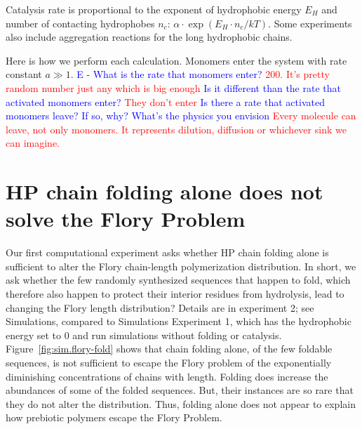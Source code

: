 \documentclass[journal=jacsat,manuscript=article,layout=twocolumn]{achemso}
\newcommand*{\ga}{\alpha}
\newcommand*{\red}[1]{\textcolor{red}{#1}}
\newcommand*{\blue}[1]{\textcolor{blue}{#1}}
\begin{document}
Catalysis rate is proportional to the exponent of hydrophobic energy $E_H$ and number of 
contacting hydrophobes $n_c$: $\ga\cdot\exp(E_{H}\cdot n_{c}/kT)$. Some experiments also include 
aggregation reactions for the long hydrophobic chains.

Here is how we perform each calculation.  Monomers enter the system with rate constant $a\gg1$.  
\blue{E - What is the rate that monomers enter? }\red{200. It's pretty random number just 
any which is big enough} \blue{Is it different than the rate that activated monomers enter?} 
\red{They don't enter}  \blue{Is there a rate that activated monomers leave?  If so, why? What's the 
physics you envision } \red{Every molecule can leave, not only monomers. It represents dilution, 
diffusion or whichever sink we can imagine.}
 



\section{HP chain folding alone does not solve the Flory Problem}
Our first computational experiment asks whether HP chain folding alone is sufficient to 
alter the Flory chain-length polymerization distribution.  In short, we ask whether the few randomly 
synthesized sequences that happen to fold, which therefore also happen to protect their interior 
residues from hydrolysis, lead to changing the Flory length distribution?  Details are in 
experiment 
2; see Simulations, compared to Simulations  Experiment 1, which has the 
hydrophobic energy set to 0 and run simulations without folding or catalysis.  
Figure~\ref{fig:sim.flory-fold} 
shows that chain folding alone, of the few foldable sequences, is not sufficient to escape the Flory 
problem of the exponentially diminishing concentrations of chains with length.  Folding does 
increase the abundances of some of the folded sequences.  But, their instances are so rare that they 
do not alter the distribution.  Thus, folding alone does not appear to explain how prebiotic 
polymers escape the Flory Problem.
\end{document}
